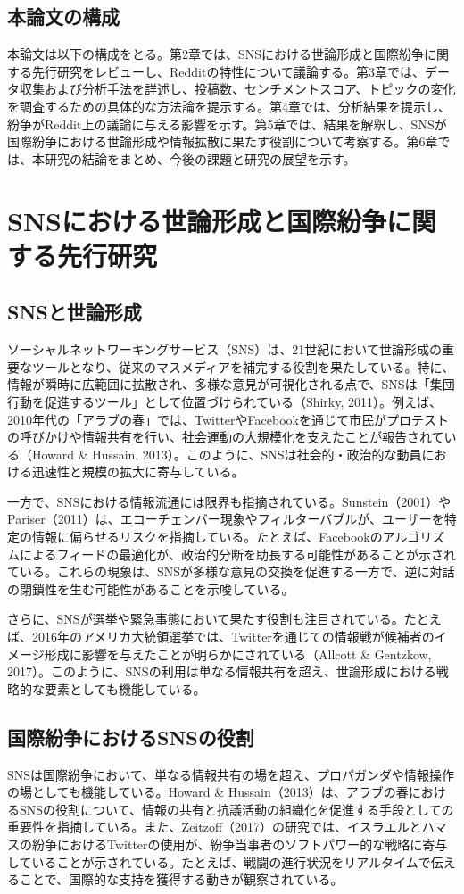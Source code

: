 \documentclass[11pt, a4j]{jreport}
\begin{document}
    \section{本論文の構成}
    本論文は以下の構成をとる。第2章では、SNSにおける世論形成と国際紛争に関する先行研究をレビューし、Redditの特性について議論する。第3章では、データ収集および分析手法を詳述し、投稿数、センチメントスコア、トピックの変化を調査するための具体的な方法論を提示する。第4章では、分析結果を提示し、紛争がReddit上の議論に与える影響を示す。第5章では、結果を解釈し、SNSが国際紛争における世論形成や情報拡散に果たす役割について考察する。第6章では、本研究の結論をまとめ、今後の課題と研究の展望を示す。

    \chapter{SNSにおける世論形成と国際紛争に関する先行研究}

    \section{SNSと世論形成}
    ソーシャルネットワーキングサービス（SNS）は、21世紀において世論形成の重要なツールとなり、従来のマスメディアを補完する役割を果たしている。特に、情報が瞬時に広範囲に拡散され、多様な意見が可視化される点で、SNSは「集団行動を促進するツール」として位置づけられている（Shirky, 2011）。例えば、2010年代の「アラブの春」では、TwitterやFacebookを通じて市民がプロテストの呼びかけや情報共有を行い、社会運動の大規模化を支えたことが報告されている（Howard \& Hussain, 2013）。このように、SNSは社会的・政治的な動員における迅速性と規模の拡大に寄与している。

    一方で、SNSにおける情報流通には限界も指摘されている。Sunstein（2001）やPariser（2011）は、エコーチェンバー現象やフィルターバブルが、ユーザーを特定の情報に偏らせるリスクを指摘している。たとえば、Facebookのアルゴリズムによるフィードの最適化が、政治的分断を助長する可能性があることが示されている。これらの現象は、SNSが多様な意見の交換を促進する一方で、逆に対話の閉鎖性を生む可能性があることを示唆している。

    さらに、SNSが選挙や緊急事態において果たす役割も注目されている。たとえば、2016年のアメリカ大統領選挙では、Twitterを通じての情報戦が候補者のイメージ形成に影響を与えたことが明らかにされている（Allcott \& Gentzkow, 2017）。このように、SNSの利用は単なる情報共有を超え、世論形成における戦略的な要素としても機能している。

    \section{国際紛争におけるSNSの役割}
    SNSは国際紛争において、単なる情報共有の場を超え、プロパガンダや情報操作の場としても機能している。Howard \& Hussain（2013）は、アラブの春におけるSNSの役割について、情報の共有と抗議活動の組織化を促進する手段としての重要性を指摘している。また、Zeitzoff（2017）の研究では、イスラエルとハマスの紛争におけるTwitterの使用が、紛争当事者のソフトパワー的な戦略に寄与していることが示されている。たとえば、戦闘の進行状況をリアルタイムで伝えることで、国際的な支持を獲得する動きが観察されている。
\end{document}
